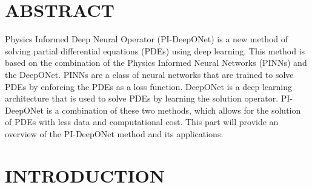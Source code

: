 \documentclass[a4paper, onecolumn, 12pt]{article}
\begin{document}

\onehalfspacing %
\section*{ABSTRACT}

Physics Informed Deep Neural Operator (PI-DeepONet) is a new method of solving
 partial differential equations (PDEs) using deep learning. This method is
  based on the combination of the Physics Informed Neural Networks (PINNs)
   and the DeepONet. PINNs are a class of neural networks that are trained
    to solve PDEs by enforcing the PDEs as a loss function. DeepONet is
     a deep learning architecture that is used to solve PDEs by learning
      the solution operator. PI-DeepONet is a combination of these two 
      methods, which allows for the solution of PDEs with less data and 
      computational cost. This part
will provide an overview of the PI-DeepONet method and its applications.

\section*{INTRODUCTION}
\end{document}
